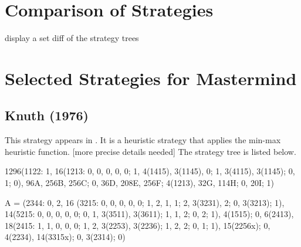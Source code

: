 \section{Comparison of Strategies}

display a set diff of the strategy trees

\section{Selected Strategies for Mastermind}

\subsection{Knuth (1976)}

This strategy appears in \cite{knuth76}. It is a heuristic strategy that applies the min-max heuristic function. [more precise details needed] The strategy tree is listed below.


{ \scriptsize
1296(1122: 1, 16(1213: 0, 0, 0, 0, 0; 1, 4(1415), 3(1145), 0; 1, 3(4115), 3(1145); 0, 1; 0), 96A, 256B, 256C; 0, 36D, 208E, 256F; 4(1213), 32G, 114H; 0, 20I; 1)

A = (2344: 0, 2, 16 (3215: 0, 0, 0, 0, 0; 1, 2, 1, 1; 2, 3(3231), 2; 0, 3(3213); 1), 
14(5215: 0, 0, 0, 0, 0; 0, 1, 3(3511), 3(3611); 1, 1, 2; 0, 2; 1), 4(1515); 0, 6(2413), 
18(2415: 1, 1, 0, 0, 0; 1, 2, 3(2253), 3(2236); 1, 2, 2; 0, 1; 1), 15(2256x); 0, 4(2234), 14(3315x); 0, 3(2314); 0) 
}

